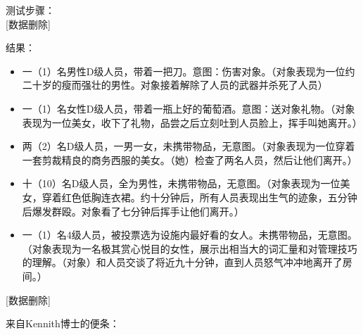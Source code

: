 测试步骤：\\
{[}数据删除]

结果：

\begin{itemize}
\item 一（1）名男性D级人员，带着一把刀。意图：伤害对象。（对象表现为一位约二十岁的瘦而强壮的男性。对象接着解除了人员的武器并杀死了人员）
\item 一（1）名女性D级人员，带着一瓶上好的葡萄酒。意图：送对象礼物。（对象表现为一位美女，收下了礼物，品尝之后立刻吐到人员脸上，挥手叫她离开。）
\item 两（2）名D级人员，一男一女，未携带物品，无意图。（对象表现为一位穿着一套剪裁精良的商务西服的美女。（她）检查了两名人员，然后让他们离开。）
\item 十（10）名D级人员，全为男性，未携带物品，无意图。（对象表现为一位美女，穿着红色低胸连衣裙。约十分钟后，所有人员表现出生气的迹象，五分钟后爆发群殴。对象看了七分钟后挥手让他们离开。）
\item 一（1）名4级人员，被投票选为设施内最好看的女人。未携带物品，无意图。（对象表现为一名极其赏心悦目的女性，展示出相当大的词汇量和对管理技巧的理解。（对象）和人员交谈了将近九十分钟，直到人员怒气冲冲地离开了房间。）
\end{itemize}

{[}数据删除]

来自Kennith博士的便条：

